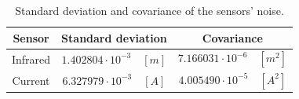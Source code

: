 \begin{table}[H]
    \centering

    \begin{tabular}{|c|c|c|}
        \hline
        \textbf{Sensor} & \textbf{Standard deviation}        & \textbf{Covariance}                  \\
        \hline
        Infrared        & $1.402804 \cdot 10^{-3} \quad [m]$ & $7.166031 \cdot 10^{-6} \quad [m^2]$ \\
        Current         & $6.327979 \cdot 10^{-3} \quad [A]$ & $4.005490 \cdot 10^{-5} \quad [A^2]$ \\
        \hline
    \end{tabular}

    \caption{Standard deviation and covariance of the sensors' noise.}
    \label{tab:sensors_noise}

\end{table}
